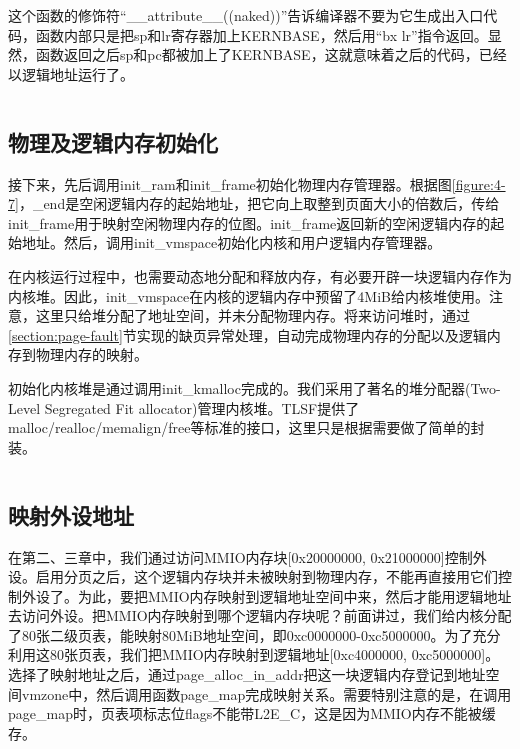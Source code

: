 \documentclass[main.tex]{subfiles}
\begin{document}
\begin{CJK*}{UTF8}{song}
这个函数的修饰符“\_\_attribute\_\_((naked))”告诉编译器不要为它生成出入口代码，函数内部只是把sp和lr寄存器加上KERNBASE，然后用“bx lr”指令返回。显然，函数返回之后sp和pc都被加上了KERNBASE，这就意味着之后的代码，已经以逻辑地址运行了。

\begin{code}
\label{code:4-25}
\inputminted[firstline=329,lastline=337,linenos,numbersep=5pt,frame=lines,framesep=2mm]{c}{src/chapter04/kernel/machdep.c}
\end{code}

\subsection{物理及逻辑内存初始化}
接下来，先后调用init\_ram和init\_frame初始化物理内存管理器。根据图\ref{figure:4-7}，\_end是空闲逻辑内存的起始地址，把它向上取整到页面大小的倍数后，传给init\_frame用于映射空闲物理内存的位图。init\_frame返回新的空闲逻辑内存的起始地址。然后，调用init\_vmspace初始化内核和用户逻辑内存管理器。

\par
在内核运行过程中，也需要动态地分配和释放内存，有必要开辟一块逻辑内存作为内核堆。因此，init\_vmspace在内核的逻辑内存中预留了4MiB给内核堆使用。注意，这里只给堆分配了地址空间，并未分配物理内存。将来访问堆时，通过\ref{section:page-fault}节实现的缺页异常处理，自动完成物理内存的分配以及逻辑内存到物理内存的映射。

\par
初始化内核堆是通过调用init\_kmalloc完成的。我们采用了著名的堆分配器(Two-Level Segregated Fit allocator)管理内核堆。TLSF提供了malloc/realloc/memalign/free等标准的接口，这里只是根据需要做了简单的封装。

\begin{code}
\label{code:4-26}
\inputminted[firstline=354,lastline=369,linenos,numbersep=5pt,frame=lines,framesep=2mm]{c}{src/chapter04/kernel/machdep.c}
\end{code}

\subsection{映射外设地址}
在第二、三章中，我们通过访问MMIO内存块[0x20000000, 0x21000000]控制外设。启用分页之后，这个逻辑内存块并未被映射到物理内存，不能再直接用它们控制外设了。为此，要把MMIO内存映射到逻辑地址空间中来，然后才能用逻辑地址去访问外设。把MMIO内存映射到哪个逻辑内存块呢？前面讲过，我们给内核分配了80张二级页表，能映射80MiB地址空间，即0xc0000000-0xc5000000。为了充分利用这80张页表，我们把MMIO内存映射到逻辑地址[0xc4000000, 0xc5000000]。选择了映射地址之后，通过page\_alloc\_in\_addr把这一块逻辑内存登记到地址空间vmzone中，然后调用函数page\_map完成映射关系。需要特别注意的是，在调用page\_map时，页表项标志位flags不能带L2E\_C，这是因为MMIO内存不能被缓存。


\end{CJK*}
\end{document}
